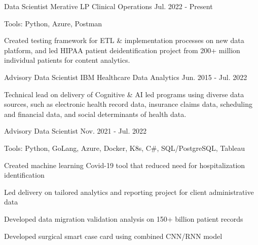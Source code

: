 

\begin{cventries}

  \cvexpentry
    {Data Scientist} %
    {Merative LP}
    {Clinical Operations} %
    {Jul. 2022 - Present}
    {
      \begin{cvheavyparagraph}
        Tools: Python, Azure, Postman
      \end{cvheavyparagraph}
    }
    {
      \begin{cvcompactparagraph}
        Created testing framework for ETL \& implementation processes on new data platform, and led HIPAA patient deidentification project from 200+ million individual patients for content analytics.
      \end{cvcompactparagraph}
    }

  \cventry
    {Advisory Data Scientist} %
    {IBM} %
    {Healthcare Data Analytics} %
    {Jun. 2015 - Jul. 2022} %
    {
      \begin{cvcompactparagraph}
        Technical lead on delivery of Cognitive \& AI led programs using diverse data sources, such as electronic health record data, insurance claims data, scheduling and financial data, and social determinants of health data.
      \end{cvcompactparagraph}
    }

  \cvexpsubposition
    {Advisory Data Scientist} %
    {Nov. 2021 - Jul. 2022} %
    {}
    {
      \begin{cvheavyparagraph}
        Tools: Python, GoLang, Azure, Docker, K8s, C\#, SQL/PostgreSQL, Tableau
      \end{cvheavyparagraph}
    }
    {
      \begin{cvitems}
        \item {Created machine learning Covid-19 tool that reduced need for hospitalization identification}
        \item {Led delivery on tailored analytics and reporting project for client administrative data}
        \item {Developed data migration validation analysis on 150+ billion patient records}
        \item {Developed surgical smart case card using combined CNN/RNN model}
      \end{cvitems}
    }


\end{cventries}
